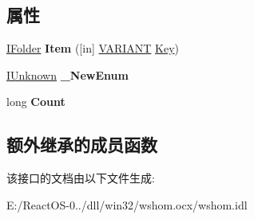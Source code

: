 \subsection*{属性}
\begin{DoxyCompactItemize}
\item 
\mbox{\label{interface_i_wsh_runtime_library_1_1_i_folder_collection_a69f98861b6b65b1439abf23574239eff}} 
\hyperlink{interface_i_wsh_runtime_library_1_1_i_folder}{I\+Folder} {\bfseries Item} (\mbox{[}in\mbox{]} \hyperlink{structtag_v_a_r_i_a_n_t}{V\+A\+R\+I\+A\+NT} \hyperlink{struct_key}{Key})
\item 
\mbox{\label{interface_i_wsh_runtime_library_1_1_i_folder_collection_a2e0cf0b81795f50ba3be8c21a3e1b1d4}} 
\hyperlink{interface_i_unknown}{I\+Unknown} {\bfseries \+\_\+\+New\+Enum}
\item 
\mbox{\label{interface_i_wsh_runtime_library_1_1_i_folder_collection_a6696b71cc5e8a5cab38bed6d6756650e}} 
long {\bfseries Count}
\end{DoxyCompactItemize}
\subsection*{额外继承的成员函数}


该接口的文档由以下文件生成\+:\begin{DoxyCompactItemize}
\item 
E\+:/\+React\+O\+S-\/0../dll/win32/wshom.\+ocx/wshom.\+idl\end{DoxyCompactItemize}
